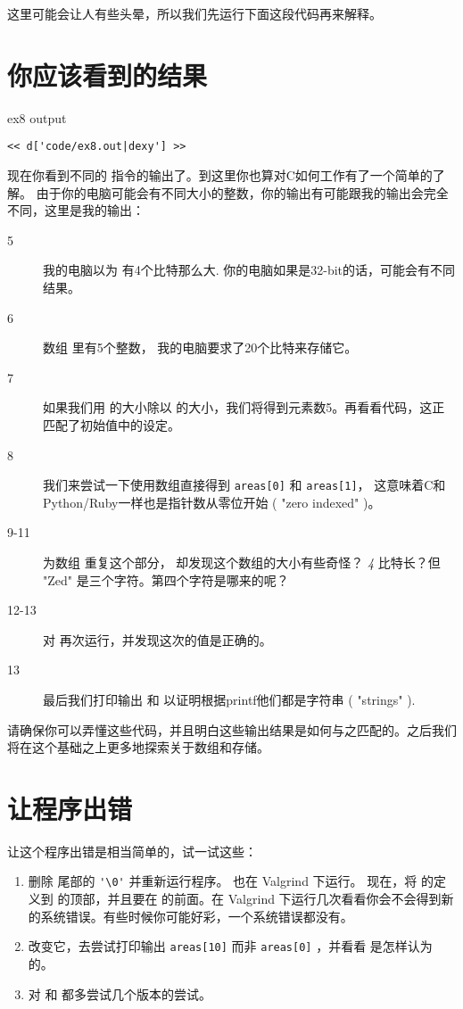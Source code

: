 这里可能会让人有些头晕，所以我们先运行下面这段代码再来解释。

\section{你应该看到的结果}

\begin{code}{ex8 output}
\begin{lstlisting}
<< d['code/ex8.out|dexy'] >>
\end{lstlisting}
\end{code}

现在你看到不同的  指令的输出了。到这里你也算对C如何工作有了一个简单的了解。 由于你的电脑可能会有不同大小的整数，你的输出有可能跟我的输出会完全不同，这里是我的输出：

\begin{description}
\item [5] 我的电脑以为  有4个比特那么大. 你的电脑如果是32-bit的话，可能会有不同结果。
\item [6] 数组  里有5个整数， 我的电脑要求了20个比特来存储它。
\item [7] 如果我们用  的大小除以  的大小，我们将得到元素数5。再看看代码，这正匹配了初始值中的设定。
\item [8] 我们来尝试一下使用数组直接得到 \verb|areas[0]| 和 \verb|areas[1]|， 这意味着C和Python/Ruby一样也是指针数从零位开始 ( "zero indexed" )。
\item [9-11] 为数组  重复这个部分， 却发现这个数组的大小有些奇怪？ \emph{4} 比特长？但 "Zed" 是三个字符。第四个字符是哪来的呢？
\item [12-13] 对  再次运行，并发现这次的值是正确的。 
\item [13] 最后我们打印输出  和  以证明根据printf他们都是字符串 ( "strings" ).
\end{description}

请确保你可以弄懂这些代码，并且明白这些输出结果是如何与之匹配的。之后我们将在这个基础之上更多地探索关于数组和存储。

\section{让程序出错}

让这个程序出错是相当简单的，试一试这些：

\begin{enumerate}
\item 删除  尾部的 \verb|'\0'| 并重新运行程序。 也在 Valgrind 下运行。 现在，将  的定义到  的顶部，并且要在  的前面。在 Valgrind 下运行几次看看你会不会得到新的系统错误。有些时候你可能好彩，一个系统错误都没有。
\item 改变它，去尝试打印输出 \verb|areas[10]| 而非 \verb|areas[0]| ，并看看  是怎样认为的。
\item 对  和  都多尝试几个版本的尝试。
\end{enumerate}

